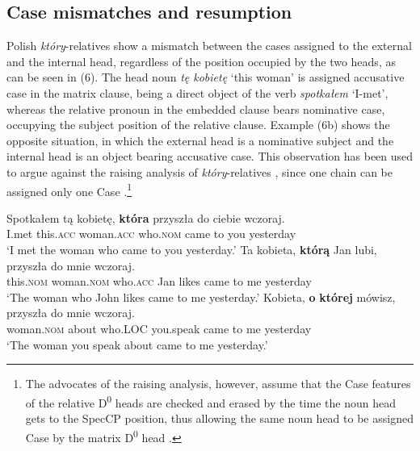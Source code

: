 \documentclass[output=paper]{langsci/langscibook}
\begin{document}
\subsection{Case mismatches and resumption}%

Polish \textit{który}{}-relatives show a mismatch between the cases assigned to the external and the internal head, regardless of the position occupied by the two heads, as can be seen in (6). The head noun \textit{tę kobietę} ‘this woman’ is assigned accusative case in the matrix clause, being a direct object of the verb \textit{spotkałem} ‘I-met’, whereas the relative pronoun in the embedded clause bears nominative case, occupying the subject position of the relative clause. Example (6b) shows the opposite situation, in which the external head is a nominative subject and the internal head is an object bearing accusative case. This observation has been used to argue against the raising analysis of \textit{który}{}-relatives \citep{Borsley1997}, since one chain can be assigned only one Case \citep{Chomsky1982}.\footnote{The advocates of the raising analysis, however, assume that the Case features of the relative D\textsuperscript{0} heads are checked and erased by the time the noun head gets to the SpecCP position, thus allowing the same noun head to be assigned Case by the matrix D\textsuperscript{0} head \citep{Kayne1994,Bianchi2000,Citko2004}.}

\ea%
    \label{ex:leska:6}
    \ea
    \gll Spotkałem   tą   kobietę,   \textbf{która}   przyszła  do  ciebie   wczoraj.        \\
          I.met   this.\textsc{acc}   woman.\textsc{acc}   who.\textsc{nom}   came   to  you  yesterday\\
    \glt ‘I met the woman who came to you yesterday.’
    \ex
    \gll Ta     kobieta,   \textbf{którą}   Jan  lubi,  przyszła  do  mnie  wczoraj.  \\
         this.\textsc{nom}   woman.\textsc{nom}   who.\textsc{acc}   Jan likes   came   to  me   yesterday\\
    \glt ‘The woman who John likes came to me yesterday.’
    \ex
    \gll Kobieta,   \textbf{o}  \textbf{której}   mówisz,   przyszła  do  mnie   wczoraj.\\
         woman.\textsc{nom}  about   who.\textsc{LOC}   you.speak   came   to   me   yesterday\\
    \glt ‘The woman you speak about came to me yesterday.’
    \z
\z
\end{document}
